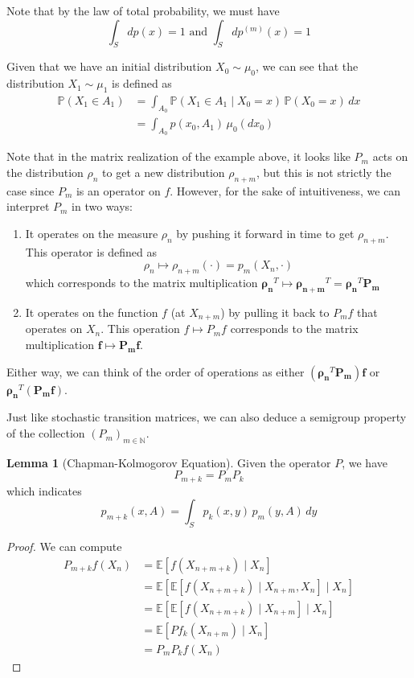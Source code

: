 \documentclass{article}
\theoremstyle{definition}
\newtheorem{lemma}[theorem]{Lemma}
\theoremstyle{remark}
\theoremstyle{definition}
\begin{document}
Note that by the law of total probability, we must have 
\[\int_S dp(x) = 1 \text{ and } \int_S dp^{(m)} (x) = 1\]

Given that we have an initial distribution $X_0 \sim \mu_0$, we can see that the distribution $X_1 \sim \mu_1$ is defined as 
\begin{align*}
    \mathbb{P}(X_1 \in A_1) & = \int_{A_0} \mathbb{P}(X_1 \in A_1 \mid X_0 = x) \, \mathbb{P}(X_0 = x) \,dx \\
    & = \int_{A_0} p(x_0, A_1) \, \mu_0 (d x_0) 
\end{align*}

Note that in the matrix realization of the example above, it looks like $P_m$ acts on the distribution $\rho_n$ to get a new distribution $\rho_{n + m}$, but this is not strictly the case since $P_m$ is an operator on $f$. However, for the sake of intuitiveness, we can interpret $P_m$ in two ways: 
\begin{enumerate}
    \item It operates on the measure $\rho_n$ by pushing it forward in time to get $\rho_{n + m}$. This operator is defined as 
    \[\rho_n \mapsto \rho_{n + m}(\cdot) = p_m (X_n, \cdot)\]
    which corresponds to the matrix multiplication $\boldsymbol{\rho_n}^T \mapsto \boldsymbol{\rho_{n + m}}^T = \boldsymbol{\rho_{n}}^T \mathbf{P_m}$
    \item It operates on the function $f$ (at $X_{n + m}$) by pulling it back to $P_m f$ that operates on $X_n$. This operation $f \mapsto P_m f$ corresponds to the matrix multiplication $\mathbf{f} \mapsto \mathbf{P_m} \mathbf{f}$. 
\end{enumerate}
Either way, we can think of the order of operations as either $(\boldsymbol{\rho_n}^T \mathbf{P_m}) \mathbf{f}$ or $\boldsymbol{\rho_n}^T (\mathbf{P_m} \mathbf{f})$. 

Just like stochastic transition matrices, we can also deduce a semigroup property of the collection $(P_m)_{m \in \mathbb{N}}$. 

\begin{lemma}[Chapman-Kolmogorov Equation]
Given the operator $P$, we have 
\[P_{m + k} = P_m P_k\]
which indicates 
\[p_{m + k} (x, A) = \int_S p_k (x, y) \, p_m (y, A) \,dy\]
\end{lemma}
\begin{proof}
We can compute 
\begin{align*}
    P_{m + k} f (X_n) & = \mathbb{E}[ f (X_{n + m + k}) \mid X_{n}] \\
    & = \mathbb{E}[ \mathbb{E}[ f(X_{n + m + k}) \mid X_{n + m}, X_n] \mid X_n] \\
    & = \mathbb{E}[ \mathbb{E}[ f(X_{n + m + k}) \mid X_{n + m}] \mid X_n] \\ 
    & = \mathbb{E}[ P f_k (X_{n + m}) \mid X_n] \\ 
    & = P_m P_k f (X_n)
\end{align*}
\end{proof}
\end{document}
